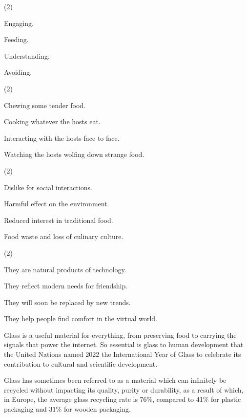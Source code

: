 \documentclass{英语试卷}
\begin{document}
\begin{choices}(2)
  \item Engaging.
  \item Feeding.
  \item Understanding.
  \item Avoiding.
\end{choices}
\begin{choices}(2)
  \item Chewing some tender food.
  \item Cooking whatever the hosts eat.
  \item Interacting with the hosts face to face.
  \item Watching the hosts wolfing down strange food.
\end{choices}
\begin{choices}(2)
  \item Dislike for social interactions.
  \item Harmful effect on the environment.
  \item Reduced interest in traditional food.
  \item Food waste and loss of culinary culture.
\end{choices}
\begin{choices}(2)
  \item They are natural products of technology.
  \item They reflect modern needs for friendship.
  \item They will soon be replaced by new trends.
  \item They help people find comfort in the virtual world.
\end{choices}
\par Glass is a useful material for everything, from preserving food to carrying the signals that power the internet. So essential is glass to human development that the United Nations named 2022 the International Year of Glass to celebrate its contribution to cultural and scientific development.\par
\par Glass has sometimes been referred to as a material which can infinitely be recycled without impacting its quality, purity or durability, as a result of which, in Europe, the average glass recycling rate is 76\%, compared to 41\% for plastic packaging and 31\% for wooden packaging.\par
\end{document}
